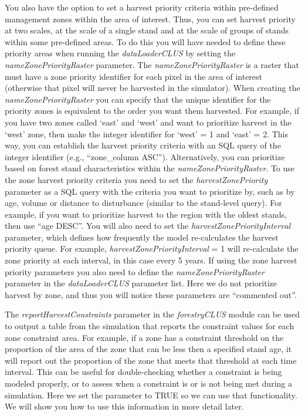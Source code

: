 \documentclass[
]{article}
\begin{document}
You also have the option to set a harvest priority criteria within
pre-defined management zones within the area of interest. Thus, you can
set harvest priority at two scales, at the scale of a single stand and
at the scale of groups of stands within some pre-defined areas. To do
this you will have needed to define these priority areas when running
the \emph{dataLoaderCLUS} by setting the \emph{nameZonePriorityRaster}
parameter. The \emph{nameZonePriorityRaster} is a raster that must have
a zone priority identifier for each pixel in the area of interest
(otherwise that pixel will never be harvested in the simulator). When
creating the \emph{nameZonePriorityRaster} you can specify that the
unique identifier for the priority zones is equivalent to the order you
want them harvested. For example, if you have two zones called `east'
and `west' and want to prioritize harvest in the `west' zone, then make
the integer identifier for `west' = 1 and `east' = 2. This way, you can
establish the harvest priority criteria with an SQL query of the integer
identifier (e.g., ``zone\_column ASC''). Alternatively, you can
prioritize based on forest stand characteristics within the
\emph{nameZonePriorityRaster}. To use the zone harvest priority criteria
you need to set the \emph{harvestZonePriority} parameter as a SQL query
with the criteria you want to prioritize by, such as by age, volume or
distance to disturbance (similar to the stand-level query). For example,
if you want to prioritize harvest to the region with the oldest stands,
then use ``age DESC''. You will also need to set the
\emph{harvestZonePriorityInterval} parameter, which defines how
frequently the model re-calculates the harvest priority queue. For
example, \emph{harvestZonePriorityInterval} = 1 will re-calculate the
zone priority at each interval, in this case every 5 years. If using the
zone harvest priority parameters you also need to define the
\emph{nameZonePriorityRaster} parameter in the \emph{dataLoaderCLUS}
parameter list. Here we do not prioritize harvest by zone, and thus you
will notice these parameters are ``commented out''.

The \emph{reportHarvestConstraints} parameter in the \emph{forestryCLUS}
module can be used to output a table from the simulation that reports
the constraint values for each zone constraint area. For example, if a
zone has a constraint threshold on the proportion of the area of the
zone that can be less then a specified stand age, it will report out the
proportion of the zone that meets that threshold at each time interval.
This can be useful for double-checking whether a constraint is being
modeled properly, or to assess when a constraint is or is not being met
during a simulation. Here we set the parameter to TRUE so we can use
that functionality. We will show you how to use this information in more
detail later.
\end{document}
